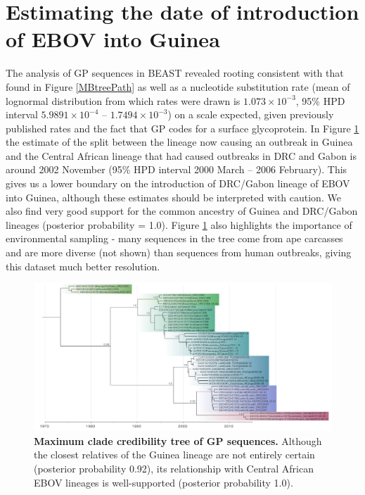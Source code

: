 \documentclass[11pt,oneside,letterpaper]{article}
\begin{document}
\section*{Estimating the date of introduction of EBOV into Guinea}
The analysis of GP sequences in BEAST revealed rooting consistent with that found in Figure \ref{MBtreePath} as well as a nucleotide substitution rate (mean of lognormal distribution from which rates were drawn is $1.073\times10^{-3}$, 95\% HPD interval $5.9891\times10^{-4}$ -- $1.7494\times10^{-3}$) on a scale expected, given previously published rates \cite{carroll2013} and the fact that GP codes for a surface glycoprotein.
In Figure \ref{beastTree} the estimate of the split between the lineage now causing an outbreak in Guinea and the Central African lineage that had caused outbreaks in DRC and Gabon is around 2002 November (95\% HPD interval 2000 March -- 2006 February).
This gives us a lower boundary on the introduction of DRC/Gabon lineage of EBOV into Guinea, although these estimates should be interpreted with caution.
We also find very good support for the common ancestry of Guinea and DRC/Gabon lineages (posterior probability = 1.0).
Figure \ref{beastTree} also highlights the importance of environmental sampling - many sequences in the tree come from ape carcasses and are more diverse (not shown) than sequences from human outbreaks, giving this dataset much better resolution.

\begin{figure}[h!]
\centering  
\includegraphics[width=1\textwidth]  {figures/EBOV_GP_46_GTRG_UCLN_EGC_MCC_tree.pdf}
\caption{\textbf{Maximum clade credibility tree of GP sequences.}
Although the closest relatives of the Guinea lineage are not entirely certain (posterior probability 0.92), its relationship with Central African EBOV lineages is well-supported (posterior probability 1.0).}
\label{beastTree}
\end{figure}
\end{document}
